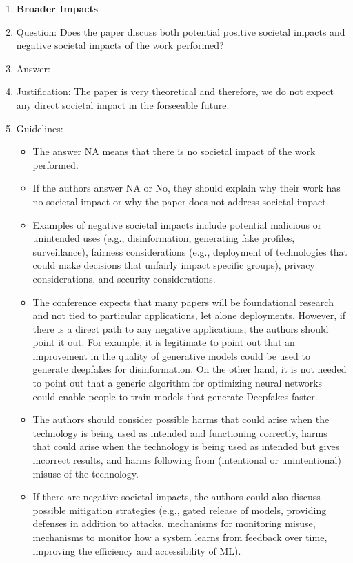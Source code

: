 \documentclass{article} %
\newcounter{ct}
\theoremstyle{definition}
\theoremstyle{remark}
\begin{document}
\begin{enumerate}
\item {\bf Broader Impacts}
    \item[] Question: Does the paper discuss both potential positive societal impacts and negative societal impacts of the work performed?
    \item[] Answer: \answerNA{} %
    \item[] Justification: The paper is very theoretical and therefore, we do not expect any direct societal impact in the forseeable future.
    \item[] Guidelines:
    \begin{itemize}
        \item The answer NA means that there is no societal impact of the work performed.
        \item If the authors answer NA or No, they should explain why their work has no societal impact or why the paper does not address societal impact.
        \item Examples of negative societal impacts include potential malicious or unintended uses (e.g., disinformation, generating fake profiles, surveillance), fairness considerations (e.g., deployment of technologies that could make decisions that unfairly impact specific groups), privacy considerations, and security considerations.
        \item The conference expects that many papers will be foundational research and not tied to particular applications, let alone deployments. However, if there is a direct path to any negative applications, the authors should point it out. For example, it is legitimate to point out that an improvement in the quality of generative models could be used to generate deepfakes for disinformation. On the other hand, it is not needed to point out that a generic algorithm for optimizing neural networks could enable people to train models that generate Deepfakes faster.
        \item The authors should consider possible harms that could arise when the technology is being used as intended and functioning correctly, harms that could arise when the technology is being used as intended but gives incorrect results, and harms following from (intentional or unintentional) misuse of the technology.
        \item If there are negative societal impacts, the authors could also discuss possible mitigation strategies (e.g., gated release of models, providing defenses in addition to attacks, mechanisms for monitoring misuse, mechanisms to monitor how a system learns from feedback over time, improving the efficiency and accessibility of ML).
    \end{itemize}


\end{enumerate}
\end{document}
